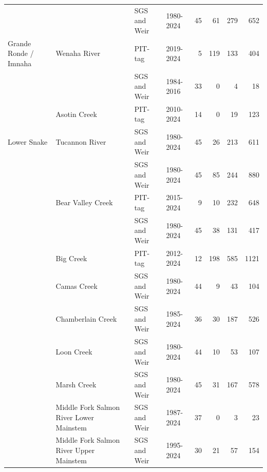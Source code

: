 \documentclass[10pt,a4paper]{article}
\begin{document}
\begin{table}
\begin{tabular}[t]{llllrrrr}
 &  & SGS and Weir & 1980-2024 & 45 & 61 & 279 & 652\\

\multirow[t]{-12}{*}[7\dimexpr\aboverulesep+\belowrulesep+\cmidrulewidth]{\raggedright\arraybackslash Grande Ronde / Imnaha} & \multirow[t]{-2}{*}{\raggedright\arraybackslash Wenaha River} & PIT-tag & 2019-2024 & 5 & 119 & 133 & 404\\

 &  & SGS and Weir & 1984-2016 & 33 & 0 & 4 & 18\\

 & \multirow[t]{-2}{*}{\raggedright\arraybackslash Asotin Creek} & PIT-tag & 2010-2024 & 14 & 0 & 19 & 123\\

\multirow[t]{-3}{*}[1\dimexpr\aboverulesep+\belowrulesep+\cmidrulewidth]{\raggedright\arraybackslash Lower Snake} & Tucannon River & SGS and Weir & 1980-2024 & 45 & 26 & 213 & 611\\

 &  & SGS and Weir & 1980-2024 & 45 & 85 & 244 & 880\\

 & \multirow[t]{-2}{*}{\raggedright\arraybackslash Bear Valley Creek} & PIT-tag & 2015-2024 & 9 & 10 & 232 & 648\\

 &  & SGS and Weir & 1980-2024 & 45 & 38 & 131 & 417\\

 & \multirow[t]{-2}{*}{\raggedright\arraybackslash Big Creek} & PIT-tag & 2012-2024 & 12 & 198 & 585 & 1121\\

 & Camas Creek & SGS and Weir & 1980-2024 & 44 & 9 & 43 & 104\\

 & Chamberlain Creek & SGS and Weir & 1985-2024 & 36 & 30 & 187 & 526\\

 & Loon Creek & SGS and Weir & 1980-2024 & 44 & 10 & 53 & 107\\

 & Marsh Creek & SGS and Weir & 1980-2024 & 45 & 31 & 167 & 578\\

 & Middle Fork Salmon River Lower Mainstem & SGS and Weir & 1987-2024 & 37 & 0 & 3 & 23\\

 & Middle Fork Salmon River Upper Mainstem & SGS and Weir & 1995-2024 & 30 & 21 & 57 & 154\\


\end{tabular}
\end{table}
\end{document}
